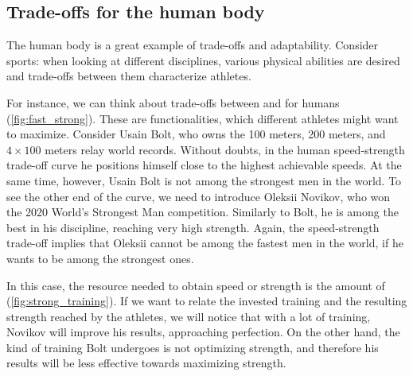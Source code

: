 \vfill
\clearpage

\subsection{Trade-offs for the human body}

\begin{marginfigure}
    \centering
    \caption{}
    \label{fig:fast_strong}
\end{marginfigure}

The human body is a great example of trade-offs and adaptability.
Consider sports: when looking at different disciplines, various physical abilities are desired and trade-offs between them characterize athletes.

For instance, we can think about trade-offs between  and  for humans (\cref{fig:fast_strong}).
These are functionalities, which different athletes might want to maximize.
Consider Usain Bolt, who owns the 100 meters, 200 meters, and~$4\times 100$ meters relay world records.
Without doubts, in the human speed-strength trade-off curve he positions himself close to the highest achievable speeds.
At the same time, however, Usain Bolt is not among the strongest men in the world.
To see the other end of the curve, we need to introduce Oleksii Novikov, who won the 2020 World's Strongest Man competition.
Similarly to Bolt, he is among the best in his discipline, reaching very high strength.
Again, the speed-strength trade-off implies that Oleksii cannot be among the fastest men in the world, if he wants to be among the strongest ones.

\begin{marginfigure}
    \centering
    \caption{}
    \label{fig:strong_training}
\end{marginfigure}

In this case, the resource needed to obtain speed or strength is the amount of  (\cref{fig:strong_training}).
If we want to relate the invested training and the resulting strength reached by the athletes, we will notice that with a lot of training, Novikov will improve his results, approaching perfection.
On the other hand, the kind of training Bolt undergoes is not optimizing strength, and therefore his results will be less effective towards maximizing strength.


